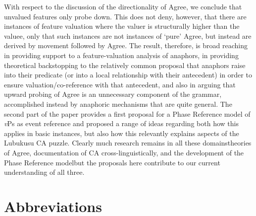 \documentclass[output=paper
,modfonts
,nonflat
]{langsci/langscibook}
\begin{document}
With respect to the discussion of the directionality of Agree, we conclude that unvalued features only probe down.  This does not deny, however, that there are instances of feature valuation where the valuer is structurally higher than the valuee, only that such instances are not instances of `pure' Agree, but instead are derived by movement followed by Agree. The result, therefore, is broad reaching in providing support to a feature-valuation analysis of anaphors, in providing theoretical backstopping to the relatively common proposal that anaphors raise into their predicate (or into a local relationship with their antecedent) in order to ensure valuation/co-reference with that antecedent, and also in arguing that upward probing of Agree is an unnecessary component of the grammar, accomplished instead by anaphoric mechanisms that are quite general. The second part of the paper provides a first proposal for a Phase Reference model of \textit{v}Ps as event reference and proposed a range of ideas regarding both how this applies in basic instances, but also how this relevantly explains aspects of the Lubukusu CA puzzle. Clearly much research remains in all these domains\textemdash theories of Agree, documentation of CA cross-linguistically, and the development of the Phase Reference model\textemdash but the proposals here contribute to our current understanding of all three. 

\newpage\section*{Abbreviations}
\end{document}
